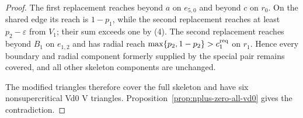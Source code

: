\begin{proof}
The first replacement reaches beyond $a$ on $e_{5,0}$ and beyond $c$ on
$r_0$. On the shared edge its reach is $1-p_1$, while the second replacement
reaches at least $p_2-\varepsilon$ from $V_1$; their sum exceeds one by (4).
The second replacement reaches beyond $B_1$ on $e_{1,2}$ and has radial
reach $\max\{p_2,1-p_2\}>c_1^{\rm req}$ on $r_1$. Hence every boundary and
radial component formerly supplied by the special pair remains covered, and
all other skeleton components are unchanged.

The modified triangles therefore cover the full skeleton and have six
nonsupercritical Vd0 V triangles. Proposition~\ref{prop:nplus-zero-all-vd0}
gives the contradiction.
\end{proof}


